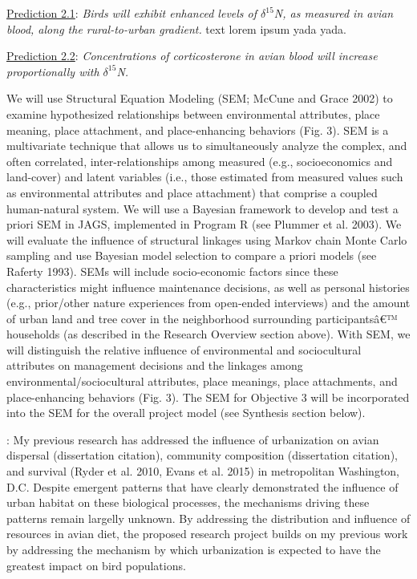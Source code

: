 \documentclass[12pt]{article}
\begin{document}

\noindent \underline{Prediction 2.1}: \textit{Birds will exhibit enhanced levels of $\delta^{15}$N, as measured in avian blood, along the rural-to-urban gradient.} 
text lorem ipsum yada yada. \par


\noindent \underline{Prediction 2.2}: \textit{Concentrations of corticosterone in avian blood will increase proportionally with $\delta^{15}$N.} \par \par

We will use Structural Equation Modeling (SEM; McCune and Grace 2002) to examine hypothesized relationships between environmental attributes, place meaning, place attachment, and place-enhancing behaviors (Fig. 3). SEM is a multivariate 
technique that allows us to simultaneously analyze the complex, and often correlated, inter-relationships among measured (e.g., socioeconomics and land-cover) and latent variables (i.e., those estimated from measured values such as 
environmental attributes and place attachment) that comprise a coupled human-natural system. We will use a Bayesian framework to develop and test a priori SEM in JAGS, implemented in Program R (see Plummer et al. 2003). We will evaluate 
the influence of structural linkages using Markov chain Monte Carlo sampling and use Bayesian model selection to compare a priori models (see Raferty 1993). SEMs will include socio-economic factors since these characteristics might 
influence maintenance decisions, as well as personal histories (e.g., prior/other nature experiences from open-ended interviews) and the amount of urban land and tree cover in the neighborhood surrounding participantsâ€™ households (as 
described in the Research Overview section above). With SEM, we will distinguish the relative influence of environmental and sociocultural attributes on management decisions and the linkages among environmental/sociocultural attributes, 
place meanings, place attachments, and place-enhancing behaviors (Fig. 3). The SEM for Objective 3 will be incorporated into the SEM for the overall project model (see Synthesis section below).


: 
My previous research has addressed the influence of urbanization on avian dispersal (dissertation citation), community composition (dissertation citation), and survival (Ryder et al. 2010, Evans et al. 2015) in metropolitan Washington, D.C. Despite emergent patterns that have clearly demonstrated the influence of urban habitat on these biological processes, the mechanisms driving these patterns remain largelly unknown. By addressing the distribution and influence of resources in avian diet, the proposed research project builds on my previous work by addressing the mechanism by which urbanization is expected to have the greatest impact on bird populations.
\end{document}
